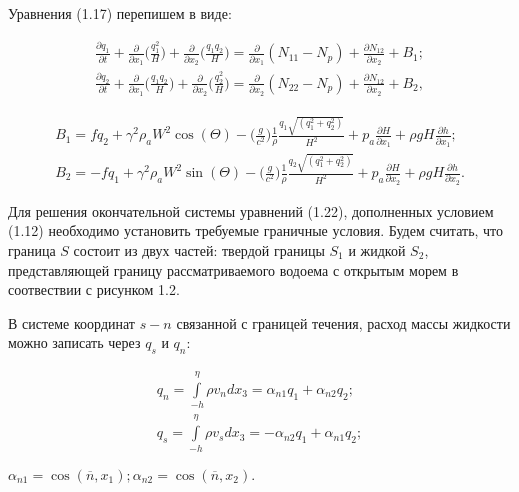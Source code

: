 \documentclass[14pt]{extreport}
\begin{document}
Уравнения (1.17) перепишем в виде:


\begin{eqnarray} 
\frac{\partial q_1}{\partial t} + \frac{\partial}{\partial x_1} \bigg(\frac{q_1^2}{H}\bigg)+\frac{\partial }{\partial x_2}\bigg(\frac{q_1 q_2}{H}\bigg) = \frac{\partial}{\partial x_1} (N_{11}-N_p) + \frac{\partial N_{12}}{\partial x_2} + B_1; \nonumber\\
\frac{\partial q_2}{\partial t} + \frac{\partial}{\partial x_1} \bigg(\frac{q_1 q_2}{H}\bigg)+\frac{\partial }{\partial x_2}\bigg(\frac{q_2^2}{H}\bigg) = \frac{\partial}{\partial x_2} (N_{22}-N_p) + \frac{\partial N_{12}}{\partial x_2} + B_2,
\end{eqnarray}


\begin{eqnarray}
B_1=fq_2+\gamma^2\rho_aW^2\cos(\Theta)-\bigg(\frac{g}{c^2}\bigg)\frac{1}{\rho}\frac{q_1\sqrt{(q_1^2+q_2^2)}}{H^2} + p_a \frac{\partial H}{\partial x_1} + \rho gH\frac{\partial h}{\partial x_1}; \nonumber\\
B_2=-fq_1+\gamma^2\rho_aW^2\sin(\Theta)-\bigg(\frac{g}{c^2}\bigg)\frac{1}{\rho}\frac{q_2\sqrt{(q_1^2+q_2^2)}}{H^2} + p_a \frac{\partial H}{\partial x_2} + \rho gH\frac{\partial h}{\partial x_2}.
\end{eqnarray}

Для решения окончательной системы уравнений (1.22), дополненных условием (1.12) необходимо установить требуемые граничные условия. Будем считать, что граница $S$ состоит из двух частей: твердой границы $S_1$ и жидкой $S_2$, представляющей границу рассматриваемого водоема с открытым морем в соотвествии с рисунком 1.2.


В системе координат $s-n$ связанной с границей течения, расход массы жидкости можно записать через $q_s$ и $q_n$:

\begin{eqnarray}
q_n=\int\limits^\eta_{-h} \rho v_n dx_3= \alpha_{n1}q_1+\alpha_{n2}q_2; \nonumber\\
q_s=\int\limits^\eta_{-h} \rho v_s dx_3= -\alpha_{n2}q_1+\alpha_{n1}q_2;
\end{eqnarray}

 $\alpha_{n1}=\cos(\overline{n},x_1); \alpha_{n2}=\cos(\overline{n},x_2).$
\end{document}
